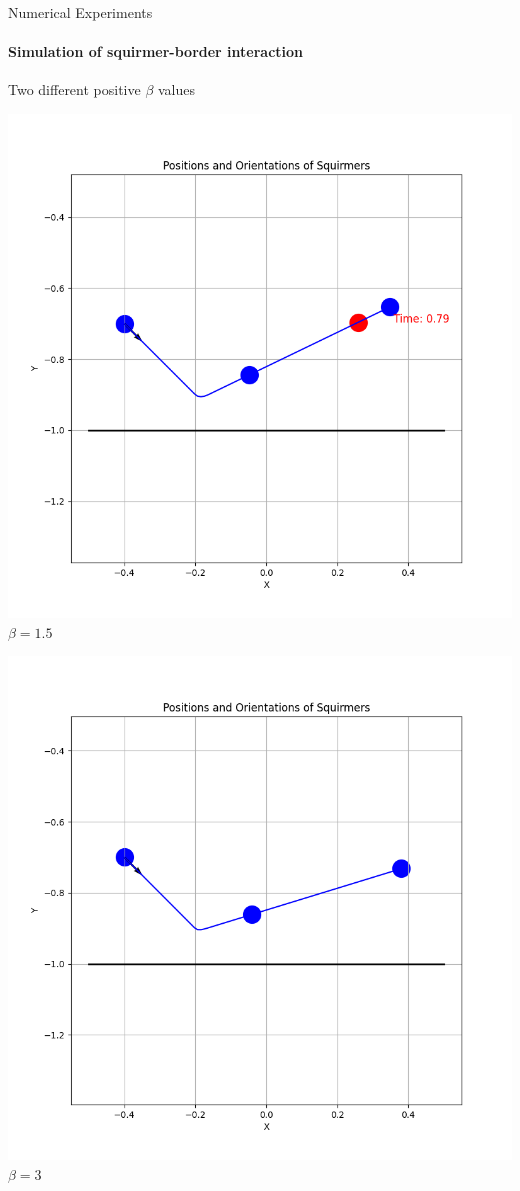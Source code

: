 \documentclass{beamer}
\begin{document}
\begin{frame}{Numerical Experiments}
    \framesubtitle{Simulation of squirmer-border interaction}
    \begin{center}
        Two different positive $\beta$ values
    \end{center}
    \begin{minipage}{0.49\textwidth}
        \centering
        \includegraphics[width=1\textwidth]{../../graphs/simulations/border/beta1_5/mpi_4.png}
        $\beta = 1.5$
    \end{minipage}
    \begin{minipage}{0.49\textwidth}
        \centering
        \includegraphics[width=1\textwidth]{../../graphs/simulations/border/beta3/mpi_4.png}
        $\beta = 3$
    \end{minipage}
\end{frame}
\end{document}
